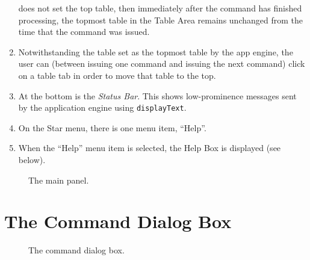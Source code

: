 \documentclass[11pt]{article}
\begin{document}
\begin{enumerate}
  does not set the top table, then immediately
  after the command has finished processing, the topmost table in the
  Table Area remains unchanged from the time that the command was issued.
\item Notwithstanding the table set as the topmost table by the app
  engine, the user can (between issuing one command and issuing the
  next command) click on a table tab in order to move that table to
  the top.
\item At the bottom is the {\it Status Bar}.  This shows low-prominence
  messages sent by the application engine using {\tt displayText}.
\item On the Star menu, there is one menu item, ``Help''.
\item When the ``Help'' menu item is selected, the Help Box is
  displayed (see below).
\end{enumerate}

\begin{figure}[t]

\centerline{}

\caption{
  The main panel.
}
\label{mainPanelFig}
\end{figure}


\section{The Command Dialog Box}

\begin{figure}

\centerline{\epsfxsize=5.5in }

\caption{
  The command dialog box.
}
\label{commandDialogBoxFig}
\end{figure}
\end{document}

